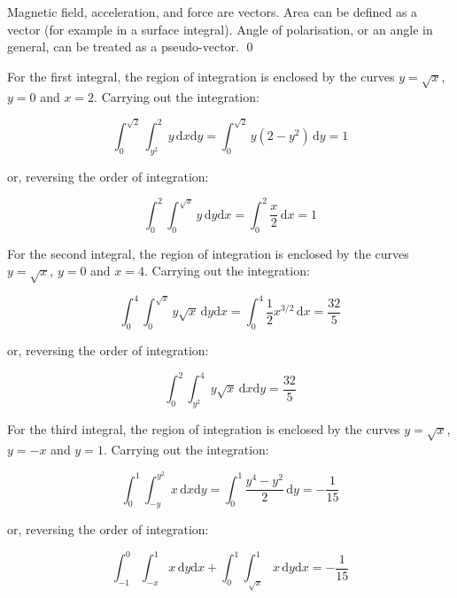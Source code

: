 \documentclass[12pt]{article}
\begin{document}



Magnetic field, acceleration, and force are vectors. Area can be defined as a vector (for example in a surface integral). Angle of polarisation, or an angle in general, can be treated as a pseudo-vector.
\qed



For the first integral, the region of integration is enclosed by the curves $y = \sqrt{x}$, $y = 0$ and $x = 2$. Carrying out the integration:

\begin{equation}
    \int_{0}^{\sqrt{2}} \int_{y^{2}}^{2} y \, \mathrm{d}x \mathrm{d}y = \int_{0}^{\sqrt{2}} y(2 - y^{2}) \, \mathrm{d}y = 1
\end{equation}

or, reversing the order of integration:

\begin{equation}
    \int_{0}^{2} \int_{0}^{\sqrt{x}} y \, \mathrm{d}y \mathrm{d}x = \int_{0}^{2} \frac{x}{2} \, \mathrm{d}x = 1
\end{equation}

For the second integral, the region of integration is enclosed by the curves $y = \sqrt{x}$, $y = 0$ and $x = 4$. Carrying out the integration:

\begin{equation}
    \int_{0}^{4} \int_{0}^{\sqrt{x}} y \sqrt{x} \, \mathrm{d}y \mathrm{d}x = \int_{0}^{4} \frac{1}{2} x^{3/2} \, \mathrm{d}x = \frac{32}{5}
\end{equation}

or, reversing the order of integration:

\begin{equation}
    \int_{0}^{2} \int_{y^{2}}^{4} y \sqrt{x} \, \mathrm{d}x \mathrm{d}y = \frac{32}{5}
\end{equation}

For the third integral, the region of integration is enclosed by the curves $y = \sqrt{x}$, $y = -x$ and $y = 1$. Carrying out the integration:

\begin{equation}
    \int_{0}^{1} \int_{-y}^{y^{2}} x \, \mathrm{d}x \mathrm{d}y = \int_{0}^{1} \frac{y^{4} - y^{2}}{2} \, \mathrm{d}y = -\frac{1}{15}
\end{equation}

or, reversing the order of integration:

\begin{equation}
    \int_{-1}^{0} \int_{-x}^{1} x \, \mathrm{d}y \mathrm{d}x + \int_{0}^{1} \int_{\sqrt{x}}^{1} x \, \mathrm{d}y \mathrm{d}x = -\frac{1}{15}
\end{equation}
\end{document}
